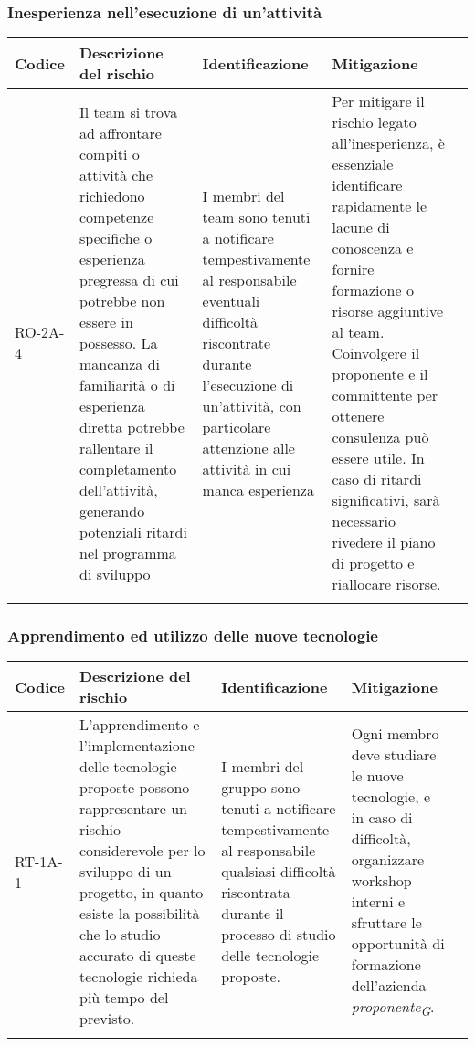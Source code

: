 \subsubsection{Inesperienza nell'esecuzione di un'attività} \label{sec:inexpAttività}
\begin{table}[H]
    \centering
    \begin{tabularx}{\textwidth}{l>{\RaggedRight}X>{\RaggedRight}X>{\RaggedRight}X>{\RaggedRight}X}
    \toprule
    \rowcolor{gray!50}
    \textbf{Codice} & \textbf{Descrizione del rischio} & \textbf{Identificazione} & \textbf{Mitigazione} \\
    \midrule
    \addlinespace 
    RO-2A-4 & 
    Il team si trova ad affrontare compiti o attività che richiedono competenze specifiche o esperienza pregressa di cui potrebbe non essere in possesso. La mancanza di familiarità o di esperienza diretta potrebbe rallentare il completamento dell'attività, generando potenziali ritardi nel programma di sviluppo &
    I membri del team sono tenuti a notificare tempestivamente al responsabile eventuali difficoltà riscontrate durante l'esecuzione di un'attività, con particolare attenzione alle attività in cui manca esperienza &
    Per mitigare il rischio legato all'inesperienza, è essenziale identificare rapidamente le lacune di conoscenza e fornire formazione o risorse aggiuntive al team. Coinvolgere il proponente e il committente per ottenere consulenza può essere utile. In caso di ritardi significativi, sarà necessario rivedere il piano di progetto e riallocare risorse.\\
    \bottomrule
    \addlinespace 
    \end{tabularx}
\end{table}

\subsubsection{Apprendimento ed utilizzo delle nuove tecnologie} \label{sec:rischioTec}
\begin{table}[H]
    \centering
    \begin{tabularx}{\textwidth}{l>{\RaggedRight}X>{\RaggedRight}X>{\RaggedRight}X>{\RaggedRight}X}
    \toprule
    \rowcolor{gray!50}
    \textbf{Codice} & \textbf{Descrizione del rischio} & \textbf{Identificazione} & \textbf{Mitigazione} \\
    \midrule
    \addlinespace 
    RT-1A-1 & 
    L’apprendimento e l'implementazione delle tecnologie proposte possono rappresentare un rischio considerevole per lo sviluppo di un progetto, in quanto esiste la possibilità che lo studio accurato di queste tecnologie richieda più tempo del previsto. & 
    I membri del gruppo sono tenuti a notificare tempestivamente al responsabile qualsiasi difficoltà riscontrata durante il processo di studio delle tecnologie proposte. &
    Ogni membro deve studiare le nuove tecnologie, e in caso di difficoltà, organizzare workshop interni e sfruttare le opportunità di formazione dell'azienda \textit{proponente}\textsubscript{\textit{G}}.\\
    \bottomrule
    \addlinespace 
    \end{tabularx}
\end{table}

